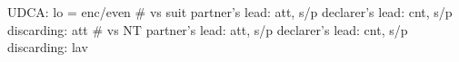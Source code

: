 UDCA: lo = enc/even
# vs suit
partner's lead: att, s/p
declarer's lead: cnt, s/p
discarding: att
# vs NT
partner's lead: att, s/p
declarer's lead: cnt, s/p
discarding: lav